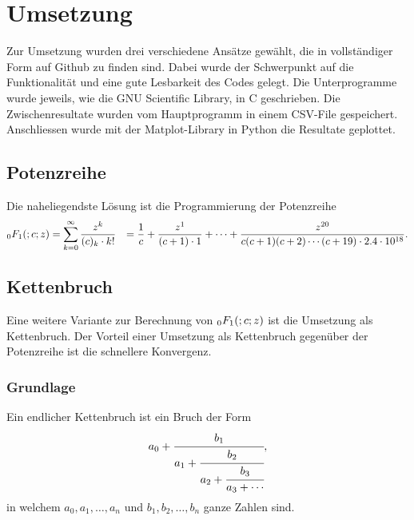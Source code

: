 %
%
%
\section{Umsetzung
\label{0f1:section:teil2}}
Zur Umsetzung wurden drei verschiedene Ansätze gewählt, die in
vollständiger Form auf Github \cite{0f1:code} zu finden sind.
Dabei wurde der Schwerpunkt auf die Funktionalität und eine gute
Lesbarkeit des Codes gelegt.
Die Unterprogramme wurde jeweils, wie die GNU Scientific Library,
%
in C geschrieben.
Die Zwischenresultate wurden vom Hauptprogramm
in einem CSV-File gespeichert.
%
Anschliessen wurde mit der Matplot-Library
%
%
in Python die Resultate geplottet.

\subsection{Potenzreihe
\label{0f1:subsection:potenzreihe}}
Die naheliegendste Lösung ist die Programmierung der Potenzreihe
\begin{align}
    \label{0f1:umsetzung:0f1:eq}
    \mathstrut_0F_1(;c;z)
    &=
    \sum_{k=0}^\infty
    \frac{z^k}{(c)_k \cdot k!}
    &= 
    \frac{1}{c}
    +\frac{z^1}{(c+1) \cdot 1}
    + \cdots
    + \frac{z^{20}}{c(c+1)(c+2)\cdots(c+19) \cdot 2.4 \cdot 10^{18}}.
\end{align}



\subsection{Kettenbruch
\label{0f1:subsection:kettenbruch}}
Eine weitere Variante zur Berechnung von $\mathstrut_0F_1(;c;z)$ ist die Umsetzung als Kettenbruch.
Der Vorteil einer Umsetzung als Kettenbruch gegenüber der Potenzreihe ist die schnellere Konvergenz.

\subsubsection{Grundlage}
Ein endlicher Kettenbruch \cite{0f1:wiki-kettenbruch} ist ein Bruch der Form
\begin{equation*}
a_0 + \cfrac{b_1}{a_1+\cfrac{b_2}{a_2+\cfrac{b_3}{a_3+\cdots}}},
\end{equation*}
in welchem $a_0, a_1,\dots,a_n$ und $b_1,b_2,\dots,b_n$ ganze Zahlen sind.

